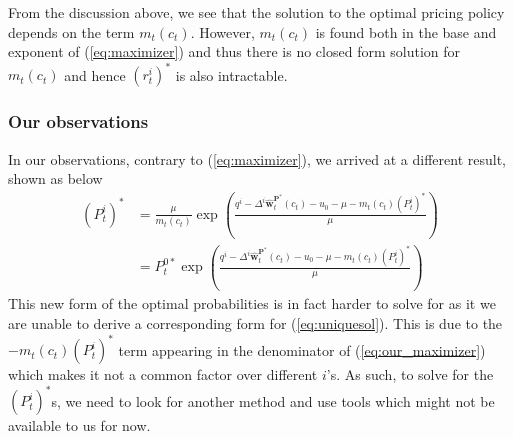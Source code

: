 From the discussion above, we see that the solution to the optimal pricing policy depends on the term $m_t(c_t)$. However, $m_t(c_t)$ is found both in the base and exponent of (\ref{eq:maximizer}) and thus there is no closed form solution for $m_t(c_t)$ and hence $(r_t^i)^\ast$ is also intractable.



\subsubsection{Our observations}

In our observations, contrary to (\ref{eq:maximizer}), we arrived at a different result, shown as below
\begin{align}
(P_t^i)^\ast &= \frac{\mu}{m_t(c_t)}\exp \left(\frac{q^i-\Delta^i \hat{\mathbf{w}}_t^{\mathbf{P}^\ast}(c_t)-u_0 - \mu- m_t(c_t)(P_t^i)^\ast}{\mu}\right)\nonumber\\
&= P_t^{0\ast}\exp \left(\frac{q^i-\Delta^i \hat{\mathbf{w}}_t^{\mathbf{P}^\ast}(c_t)-u_0 - \mu - m_t(c_t)(P_t^i)^\ast}{\mu}\right)\label{eq:our_maximizer}
\end{align}
This new form of the optimal probabilities is in fact harder to solve for as it we are unable to derive a corresponding form for (\ref{eq:uniquesol}). This is due to the $-m_t(c_t)(P_t^i)^\ast$ term appearing in the denominator of (\ref{eq:our_maximizer}) which makes it not a common factor over different $i$'s. As such, to solve for the $(P_t^i)^\ast$s, we need to look for another method and use tools which might not be available to us for now.

%





